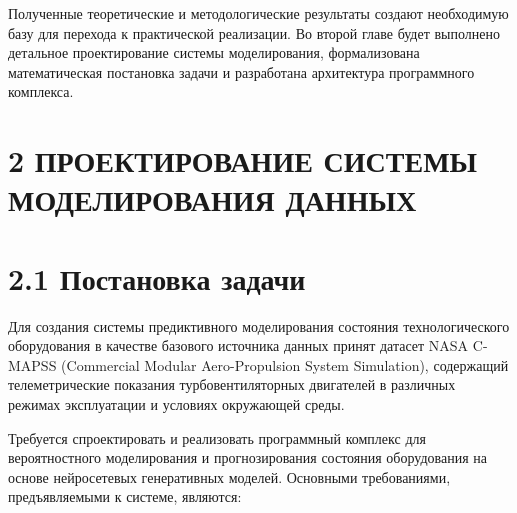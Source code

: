 \documentclass[14pt, a4paper, oneside]{extreport}
\begin{document}
Полученные теоретические и методологические результаты создают необходимую базу для перехода к практической реализации. Во второй главе будет выполнено детальное проектирование системы моделирования, формализована математическая постановка задачи и разработана архитектура программного комплекса.

\clearpage



\section{2 ПРОЕКТИРОВАНИЕ СИСТЕМЫ МОДЕЛИРОВАНИЯ ДАННЫХ}
\section{2.1 Постановка задачи}
\vspace{1em}

Для создания системы предиктивного моделирования состояния технологического оборудования в качестве базового источника данных принят датасет NASA C-MAPSS (Commercial Modular Aero-Propulsion System Simulation), содержащий телеметрические показания турбовентиляторных двигателей в различных режимах эксплуатации и условиях окружающей среды.

Требуется спроектировать и реализовать программный комплекс для вероятностного моделирования и прогнозирования состояния оборудования на основе нейросетевых генеративных моделей. Основными требованиями, предъявляемыми к системе, являются:
\end{document}
